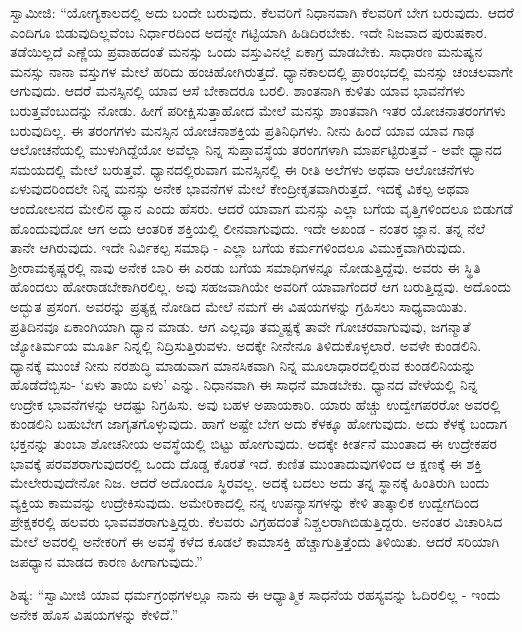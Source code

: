  ಸ್ವಾಮೀಜಿ: “ಯೋಗ್ಯಕಾಲದಲ್ಲಿ ಅದು ಬಂದೇ ಬರುವುದು. ಕೆಲವರಿಗೆ ನಿಧಾನವಾಗಿ ಕೆಲವರಿಗೆ ಬೇಗ ಬರುವುದು. ಆದರೆ ಎಂದಿಗೂ ಬಿಡುವುದಿಲ್ಲವೆಂಬ ನಿರ್ಧಾರದಿಂದ ಅದನ್ನೇ ಗಟ್ಟಿಯಾಗಿ ಹಿಡಿದಿರಬೇಕು. ಇದೇ ನಿಜವಾದ ಪುರುಷಕಾರ. ತಡೆಯಿಲ್ಲದೆ ಎಣ್ಣೆಯ ಪ್ರವಾಹದಂತೆ ಮನಸ್ಸು ಒಂದು ವಸ್ತುವಿನಲ್ಲೆ ಏಕಾಗ್ರ ಮಾಡಬೇಕು. ಸಾಧಾರಣ ಮನುಷ್ಯನ ಮನಸ್ಸು ನಾನಾ ವಸ್ತುಗಳ ಮೇಲೆ ಹರಿದು ಹಂಚಿಹೋಗಿರುತ್ತದೆ. ಧ್ಯಾನಕಾಲದಲ್ಲಿ ಪ್ರಾರಂಭದಲ್ಲಿ ಮನಸ್ಸು ಚಂಚಲವಾಗೇ ಆಗುವುದು. ಆದರೆ ಮನಸ್ಸಿನಲ್ಲಿ ಯಾವ ಆಸೆ ಬೇಕಾದರೂ ಬರಲಿ. ಶಾಂತನಾಗಿ ಕುಳಿತು ಯಾವ ಭಾವನೆಗಳು ಬರುತ್ತವೆಂಬುದನ್ನು ನೋಡು. ಹೀಗೆ ಪರೀಕ್ಷಿಸುತ್ತಾಹೋದ ಮೇಲೆ ಮನಸ್ಸು ಶಾಂತವಾಗಿ ಇತರ ಯೋಚನಾತರಂಗಗಳು ಬರುವುದಿಲ್ಲ. ಈ ತರಂಗಗಳು ಮನಸ್ಸಿನ ಯೋಚನಾಶಕ್ತಿಯ ಪ್ರತಿನಿಧಿಗಳು. ನೀನು ಹಿಂದೆ ಯಾವ ಯಾವ ಗಾಢ ಆಲೋಚನೆಯಲ್ಲಿ ಮುಳುಗಿದ್ದೆಯೋ ಅವೆಲ್ಲಾ ನಿನ್ನ ಸುಪ್ತಾವಸ್ಥೆಯ ತರಂಗಗಳಾಗಿ ಮಾರ್ಪಟ್ಟಿರುತ್ತವೆ - ಅವೇ ಧ್ಯಾನದ ಸಮಯದಲ್ಲಿ ಮೇಲೆ ಬರುತ್ತವೆ. ಧ್ಯಾನದಲ್ಲಿರುವಾಗ ಮನಸ್ಸಿನಲ್ಲಿ ಈ ರೀತಿ ಅಲೆಗಳು ಅಥವಾ ಆಲೋಚನೆಗಳು ಏಳುವುದರಿಂದಲೇ ನಿನ್ನ ಮನಸ್ಸು ಅನೇಕ ಭಾವನೆಗಳ ಮೇಲೆ ಕೇಂದ್ರೀಕೃತವಾಗಿರುತ್ತದೆ. ಇದಕ್ಕೆ ವಿಕಲ್ಪ ಅಥವಾ ಆಂದೋಲನದ ಮೇಲಿನ ಧ್ಯಾನ ಎಂದು ಹೆಸರು. ಆದರೆ ಯಾವಾಗ ಮನಸ್ಸು ಎಲ್ಲಾ ಬಗೆಯ ವೃತ್ತಿಗಳಿಂದಲೂ ಬಿಡುಗಡೆ ಹೊಂದುವುದೋ ಆಗ ಅದು ಆಂತರಿಕ ಶಕ್ತಿಯಲ್ಲಿ ಲೀನವಾಗುವುದು. ಇದೇ ಅಖಂಡ - ನಂತರ ಜ್ಞಾನ. ತನ್ನ ನೆಲೆ ತಾನೇ ಆಗಿರುವುದು. ಇದೇ ನಿರ್ವಿಕಲ್ಪ ಸಮಾಧಿ - ಎಲ್ಲಾ ಬಗೆಯ ಕರ್ಮಗಳಿಂದಲೂ ವಿಮುಕ್ತವಾಗಿರುವುದು. ಶ‍್ರೀರಾಮಕೃಷ್ಣರಲ್ಲಿ ನಾವು ಅನೇಕ ಬಾರಿ ಈ ಎರಡು ಬಗೆಯ ಸಮಾಧಿಗಳನ್ನೂ ನೋಡುತ್ತಿದ್ದೆವು. ಅವರು ಈ ಸ್ಥಿತಿ ಹೊಂದಲು ಹೋರಾಡಬೇಕಾಗಿರಲಿಲ್ಲ. ಅವು ಸಹಜವಾಗಿಯೇ ಅವರಿಗೆ ಯಾವಾಗೆಂದರೆ ಆಗ ಬರುತ್ತಿದ್ದವು. ಅದೊಂದು ಅದ್ಭುತ ಪ್ರಸಂಗ. ಅವರನ್ನು ಪ್ರತ್ಯಕ್ಷ ನೋಡಿದ ಮೇಲೆ ನಮಗೆ ಈ ವಿಷಯಗಳನ್ನು ಗ್ರಹಿಸಲು ಸಾಧ್ಯವಾಯಿತು. ಪ್ರತಿದಿನವೂ ಏಕಾಂಗಿಯಾಗಿ ಧ್ಯಾನ ಮಾಡು. ಆಗ ಎಲ್ಲವೂ ತಮ್ಮಷ್ಟಕ್ಕೆ ತಾವೇ ಗೋಚರವಾಗುವುವು, ಜಗನ್ಮಾತೆ ಜ್ಯೋತಿರ್ಮಯ ಮೂರ್ತಿ ನಿನ್ನಲ್ಲಿ ನಿದ್ರಿಸುತ್ತಿರುವಳು. ಅದಕ್ಕೇ ನೀನೇನೂ ತಿಳಿದುಕೊಳ್ಳಲಾರೆ. ಅವಳೇ ಕುಂಡಲಿನಿ. ಧ್ಯಾನಕ್ಕೆ ಮುಂಚೆ ನೀನು ನರಶುದ್ಧಿ ಮಾಡುವಾಗ ಮಾನಸಿಕವಾಗಿ ನಿನ್ನ ಮೂಲಾಧಾರದಲ್ಲಿರುವ ಕುಂಡಲಿನಿಯನ್ನು ಹೊಡೆದೆಬ್ಬಿಸು- ‘ಏಳು ತಾಯಿ ಏಳು’ ಎನ್ನು. ನಿಧಾನವಾಗಿ ಈ ಸಾಧನೆ ಮಾಡಬೇಕು. ಧ್ಯಾನದ ವೇಳೆಯಲ್ಲಿ ನಿನ್ನ ಉದ್ರೇಕ ಭಾವನೆಗಳನ್ನು ಆದಷ್ಟು ನಿಗ್ರಹಿಸು. ಅವು ಬಹಳ ಅಪಾಯಕಾರಿ. ಯಾರು ಹೆಚ್ಚು ಉದ್ವೇಗಪರರೋ ಅವರಲ್ಲಿ ಕುಂಡಲಿನಿ ಬಹುಬೇಗ ಜಾಗೃತಗೊಳ್ಳುವುದು. ಹಾಗೆ ಅಷ್ಟೇ ಬೇಗ ಅದು ಕೆಳಕ್ಕೂ ಹೋಗುವುದು. ಅದು ಕೆಳಕ್ಕೆ ಬಂದಾಗ ಭಕ್ತನನ್ನು ತುಂಬಾ ಶೋಚನೀಯ ಅವಸ್ಥೆಯಲ್ಲಿ ಬಿಟ್ಟು ಹೋಗುವುದು. ಅದಕ್ಕೇ ಕೀರ್ತನೆ ಮುಂತಾದ ಈ ಉದ್ರೇಕಪರ ಭಾವಕ್ಕೆ ಪರವಶರಾಗುವುದರಲ್ಲಿ ಒಂದು ದೊಡ್ಡ ಕೊರತೆ ಇದೆ. ಕುಣಿತ ಮುಂತಾದುವುಗಳಿಂದ ಆ ಕ್ಷಣಕ್ಕೆ ಈ ಶಕ್ತಿ ಮೇಲೇರುವುದೇನೋ ನಿಜ. ಆದರೆ ಅದೊಂದೂ ಸ್ಥಿರವಲ್ಲ. ಅದಕ್ಕೆ ಬದಲು ಅದು ತನ್ನ ಸ್ಥಾನಕ್ಕೆ ಹಿಂತಿರುಗಿ ಬಂದು ವ್ಯಕ್ತಿಯ ಕಾಮವನ್ನು ಉದ್ರೇಕಿಸುವುದು. ಅಮೇರಿಕಾದಲ್ಲಿ ನನ್ನ ಉಪನ್ಯಾಸಗಳನ್ನು ಕೇಳಿ ತಾತ್ಕಾಲಿಕ ಉದ್ವೇಗದಿಂದ ಪ್ರೇಕ್ಷಕರಲ್ಲಿ ಹಲವರು ಭಾವವಶರಾಗುತ್ತಿದ್ದರು. ಕೆಲವರು ವಿಗ್ರಹದಂತೆ ನಿಶ್ಚಲರಾಗಿಬಿಡುತ್ತಿದ್ದರು. ಅನಂತರ ವಿಚಾರಿಸಿದ ಮೇಲೆ ಅವರಲ್ಲಿ ಅನೇಕರಿಗೆ ಈ ಅವಸ್ಥೆ ಕಳೆದ ಕೂಡಲೆ ಕಾಮಾಸಕ್ತಿ ಹೆಚ್ಚಾಗುತ್ತಿತ್ತೆಂದು ತಿಳಿಯಿತು. ಆದರೆ ಸರಿಯಾಗಿ ಜಪಧ್ಯಾನ ಮಾಡದ ಕಾರಣ ಹೀಗಾಗುವುದು.” 

 ಶಿಷ್ಯ: “ಸ್ವಾಮೀಜಿ ಯಾವ ಧರ್ಮಗ್ರಂಥಗಳಲ್ಲೂ ನಾನು ಈ ಆಧ್ಯಾತ್ಮಿಕ ಸಾಧನೆಯ ರಹಸ್ಯವನ್ನು ಓದಿರಲಿಲ್ಲ - ಇಂದು ಅನೇಕ ಹೊಸ ವಿಷಯಗಳನ್ನು ಕೇಳಿದೆ.” 

